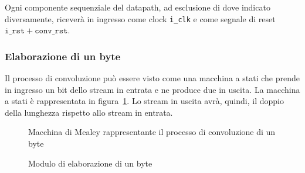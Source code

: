 \documentclass[a4paper,11pt]{article}
\begin{document}
Ogni componente sequenziale del datapath, ad esclusione di dove indicato
diversamente, riceverà in ingresso come clock \texttt{i\_clk} e come segnale di
reset $\mathtt{i\_rst} + \mathtt{conv\_rst}$.

\subsubsection{Elaborazione di un byte}

Il processo di convoluzione può essere visto come una macchina a stati che
prende in ingresso un bit dello stream in entrata e ne produce due in uscita. La
macchina a stati è rappresentata in figura~\ref{fig:convolution-fsm}. Lo stream
in uscita avrà, quindi, il doppio della lunghezza rispetto allo stream in
entrata.

\begin{figure}[htb]
  \centering
  \caption{Macchina di Mealey rappresentante il processo di convoluzione di un byte}%
  \label{fig:convolution-fsm}
\end{figure}

\begin{figure}[htb]
  \centering
  \caption{Modulo di elaborazione di un byte}%
  \label{fig:byte-processing-rtl}
\end{figure}
\end{document}
